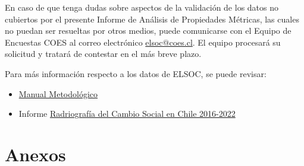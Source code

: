 \documentclass[
  12pt,
]{book}
\providecommand{\tightlist}{%
  \setlength{\itemsep}{0pt}\setlength{\parskip}{0pt}}
\begin{document}
En caso de que tenga dudas sobre aspectos de la validación de los datos no cubiertos por el presente Informe de Análisis de Propiedades Métricas, las cuales no puedan ser resueltas por otros medios, puede comunicarse con el Equipo de Encuestas COES al correo electrónico \url{elsoc@coes.cl}. El equipo procesará su solicitud y tratará de contestar en el más breve plazo.

Para más información respecto a los datos de ELSOC, se puede revisar:

\begin{itemize}
\tightlist
\item
  \href{https://manual-metodologico-elsoc.netlify.app/}{Manual Metodológico}
\item
  Informe \href{https://radiografia-cambio-social-2016-2022.netlify.app/}{Radriografía del Cambio Social en Chile 2016-2022}
\end{itemize}

\hypertarget{anexos}{%
\chapter*{Anexos}\label{anexos}}
\end{document}
